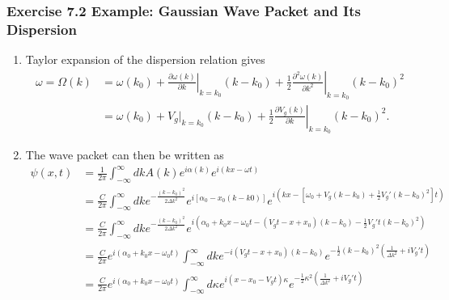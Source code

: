 \documentclass[10pt,a4paper]{article}
\theoremstyle{definition}
\begin{document}
\subsubsection{Exercise 7.2 Example: Gaussian Wave Packet and Its Dispersion}
\begin{enumerate}[label=(\alph*)]
\item Taylor expansion of the dispersion relation gives
\begin{align}
    \omega=\Omega(k)&=\omega(k_0)+\left.\frac{\partial \omega(k)}{\partial k}\right|_{k=k_0}(k-k_0)+\frac{1}{2}\left.\frac{\partial^2\omega(k)}{\partial k^2}\right|_{k=k_0}(k-k_0)^2\\
    &=\omega(k_0)+V_g|_{k=k_0}(k-k_0)+\frac{1}{2}\left.\frac{\partial V_g(k)}{\partial k}\right|_{k=k_0}(k-k_0)^2.
\end{align}
\item The wave packet can then be written as
\begin{align}
   \psi(x,t)
   &=\frac{1}{2\pi}\int_{-\infty}^\infty dk A(k)e^{i\alpha(k)}e^{i(kx-\omega t)}\\
   &=\frac{C}{2\pi}\int_{-\infty}^\infty dk e^{-\frac{(k-k_0)^2}{2\Delta k^2}}e^{i[\alpha_0-x_0(k-k0)]}e^{i(kx-[\omega_0+V_g(k-k_0)+\frac{1}{2}V_g'(k-k_0)^2] t)}\\
   &=\frac{C}{2\pi}\int_{-\infty}^\infty dk e^{-\frac{(k-k_0)^2}{2\Delta k^2}}e^{i(\alpha_0+k_0x-\omega_0t-(V_gt-x+x_0)(k-k_0)-\frac{1}{2}V_g't (k-k_0)^2)}\\
   &=\frac{C}{2\pi}e^{i(\alpha_0+k_0x-\omega_0t)}\int_{-\infty}^\infty dk e^{-i(V_gt-x+x_0)(k-k_0)} e^{-\frac{1}{2}(k-k_0)^2\left(\frac{1}{\Delta k^2}+iV_g't\right)}\\
   &=\frac{C}{2\pi}e^{i(\alpha_0+k_0x-\omega_0t)}\int_{-\infty}^\infty d\kappa e^{i(x-x_0-V_gt)\kappa} e^{-\frac{1}{2}\kappa^2\left(\frac{1}{\Delta k^2}+iV_g't\right)}\\
\end{align}


\end{enumerate}
\end{document}
